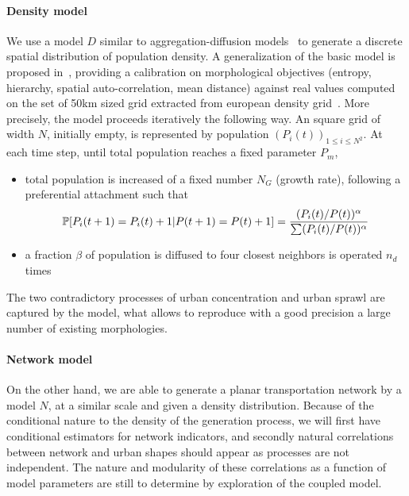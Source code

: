 \paragraph{Density model}

We use a model $D$ similar to aggregation-diffusion models~\cite{batty2006hierarchy} to generate a discrete spatial distribution of population density. A generalization of the basic model is proposed in~\cite{raimbault2016calibration}, providing a calibration on morphological objectives (entropy, hierarchy, spatial auto-correlation, mean distance) against real values computed on the set of 50km sized grid extracted from european density grid~\cite{eurostat}. More precisely, the model proceeds iteratively the following way. An square grid of width $N$, initially empty, is represented by population $(P_i(t))_{1\leq i\leq N^2}$. At each time step, until total population reaches a fixed parameter $P_m$,
\begin{itemize}
\item total population is increased of a fixed number $N_G$ (growth rate), following a preferential attachment such that 
\[\operatorname{\mathbb{P}}\!\left[P_i(t+1)=P_i(t)+1|P(t+1)=P(t)+1\right]=\frac{(P_i(t)/P(t))^{\alpha}}{\sum(P_i(t)/P(t))^{\alpha}}\]
\item a fraction $\beta$ of population is diffused to four closest neighbors is operated $n_d$ times
\end{itemize}





The two contradictory processes of urban concentration and urban sprawl are captured by the model, what allows to reproduce with a good precision a large number of existing morphologies.



\paragraph{Network model}


On the other hand, we are able to generate a planar transportation network by a model $N$, at a similar scale and given a density distribution. Because of the conditional nature to the density of the generation process, we will first have conditional estimators for network indicators, and secondly natural correlations between network and urban shapes should appear as processes are not independent. The nature and modularity of these correlations as a function of model parameters are still to determine by exploration of the coupled model.



